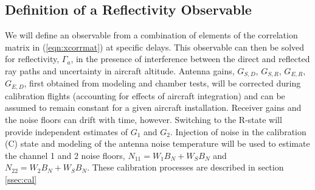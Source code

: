 \documentclass[draftcls,onecolumn]{IEEEtran}  %
\begin{document}
\subsection{Definition of a Reflectivity Observable}
 \label{sec: Observable and Forward Model}
We will define an observable from  a combination of elements of the correlation matrix in (\ref{eqn:xcorrmat}) at specific delays.
This observable can then be solved for  reflectivity, $\Gamma_a$, in the presence of  interference between the direct and reflected ray paths and uncertainty in aircraft altitude. 
Antenna gains,  $G_{S,D}$, $G_{S,R}$, $G_{E,R}$, $G_{E,D}$,  first obtained from modeling and chamber tests, will be corrected during calibration flights (accounting for effects of aircraft integration) and can be   
assumed to remain constant for a given aircraft installation. 
Receiver gains and the noise floors  can drift with time, however. 
Switching to the R-state will provide independent estimates of $G_1$ and $G_2$.
Injection of noise in the calibration (C) state  and modeling of the antenna noise temperature will be used to estimate the channel 1 and 2 noise floors, 
$N_{11} = W_1 B_N + W_S B_N$ and $N_{22} = W_2 B_N + W_S B_N$.
These calibration processes are described in section \ref{ssec:cal}
\end{document}
